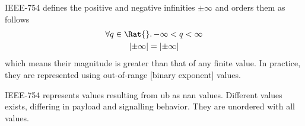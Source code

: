 IEEE-754 defines the positive and negative infinities \(\pm\infty\) and orders them as follows
\begin{gather*}
    \forall q \in \Rat{}\ldotp -\infty < q < \infty \\
    \lvert\pm\infty\rvert = \lvert\pm\infty\rvert
\end{gather*}
which means their magnitude is greater than that of any finite value.
In practice, they are represented using out-of-range [binary exponent] values.

IEEE-754 represents values resulting from \gls{ub} as \gls{nan} values.
Different values exists, differing in payload and signalling behavior.
They are unordered with all values.
